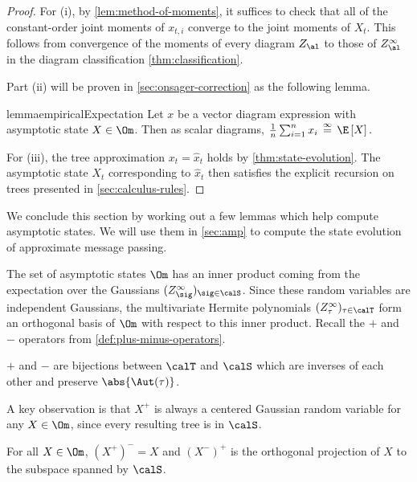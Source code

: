 \documentclass[12pt]{article}
\newcommand{\eqinf}{\,\overset{\infty}{=}\,}
\begin{document}
\begin{proof}
    For (i), by \cref{lem:method-of-moments}, it suffices to check that
    all of the constant-order joint moments of $x_{t,i}$ converge to the joint moments of $X_t$. This follows
    from convergence of the moments of every diagram $Z_\al$ to those of $Z_\al^\infty$ in the diagram classification \cref{thm:classification}.

    Part (ii) will be proven in 
    \cref{sec:onsager-correction} as the following lemma.
    \begin{restatable}{lemma}{empiricalExpectation}\label{lem:scalar-empirical-expectation}
    Let $x$ be a vector diagram expression with asymptotic state $X \in \Om$.
    Then as scalar diagrams, $\frac{1}{n}\sum_{i = 1}^n x_i \eqinf \E\left[X\right].$
    \end{restatable}
    
    For (iii), the tree approximation $x_t = \widehat{x}_t$ holds by \cref{thm:state-evolution}.
    The asymptotic state $X_t$ corresponding to $\widehat{x}_t$ then satisfies the explicit recursion on trees presented
    in \cref{sec:calculus-rules}. 
\end{proof}



We conclude this section by working out a few lemmas which help compute asymptotic
states.
We will use them in \cref{sec:amp} to compute
the state evolution of approximate
message passing.

The set of asymptotic states $\Om$ has an inner product coming from the expectation over the Gaussians $(Z_\sig^\infty)_{\sig \in \calS}$.
Since these random variables are independent Gaussians, the multivariate Hermite polynomials $(Z^\infty_\tau)_{\tau\in\calT}$ form an orthogonal basis of $\Om$ with respect to this inner product. Recall the $+$ and $-$ operators
from \cref{def:plus-minus-operators}.

\begin{fact}\label{lem:bijection}
    $+$ and $-$ are bijections between $\calT$ and $\calS$ which are inverses of each other and
    preserve $\abs{\Aut(\tau)}$.
\end{fact}
A key observation is that $X^+$ is always a centered Gaussian random variable for any $X \in \Om$,
since every resulting tree is in $\calS$.

\begin{fact}\label{cor:pm-cancel}
    For all $X \in \Om$, $(X^+)^- = X$ and $(X^-)^+$ is the orthogonal projection
    of $X$ to the subspace spanned by $\calS$.
\end{fact}
\end{document}
